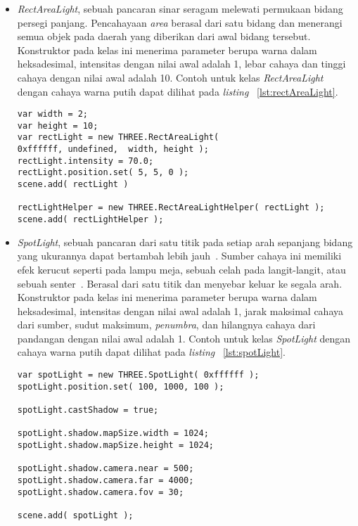 \begin{itemize}
\begin{itemize}
		\item {\it RectAreaLight}, sebuah pancaran sinar seragam melewati permukaan bidang persegi panjang. Pencahayaan {\it area} berasal dari satu bidang dan menerangi semua objek pada daerah yang diberikan dari awal bidang tersebut\cite{shadingConcept}. Konstruktor pada kelas ini menerima parameter berupa warna dalam heksadesimal, intensitas dengan nilai awal adalah 1, lebar cahaya dan tinggi cahaya dengan nilai awal adalah 10. Contoh untuk kelas {\it RectAreaLight} dengan cahaya warna putih dapat dilihat pada {\it listing} ~\ref{lst:rectAreaLight}.
\begin{lstlisting}[caption={Contoh penggunaan kelas {\it RectAreaLight}.}, label={lst:rectAreaLight},captionpos=b]
var width = 2;
var height = 10;
var rectLight = new THREE.RectAreaLight(
0xffffff, undefined,  width, height );
rectLight.intensity = 70.0;
rectLight.position.set( 5, 5, 0 );
scene.add( rectLight )

rectLightHelper = new THREE.RectAreaLightHelper( rectLight );
scene.add( rectLightHelper );
\end{lstlisting}
		\item {\it SpotLight}, sebuah pancaran dari satu titik pada setiap arah sepanjang bidang yang ukurannya dapat bertambah lebih jauh~\cite{threejs}. Sumber cahaya ini memiliki efek kerucut seperti pada lampu meja, sebuah celah pada langit-langit, atau sebuah senter~\cite{learningThreejs}. Berasal dari satu titik dan menyebar keluar ke segala arah\cite{shadingConcept}. Konstruktor pada kelas ini menerima parameter berupa warna dalam heksadesimal, intensitas dengan nilai awal adalah 1, jarak maksimal cahaya dari sumber, sudut maksimum, {\it penumbra}, dan hilangnya cahaya dari pandangan dengan nilai awal adalah 1. Contoh untuk kelas {\it SpotLight} dengan cahaya warna putih dapat dilihat pada {\it listing} ~\ref{lst:spotLight}.
\begin{lstlisting}[caption={Contoh penggunaan kelas {\it SpotLight}.}, label={lst:spotLight},captionpos=b]
var spotLight = new THREE.SpotLight( 0xffffff );
spotLight.position.set( 100, 1000, 100 );

spotLight.castShadow = true;

spotLight.shadow.mapSize.width = 1024;
spotLight.shadow.mapSize.height = 1024;

spotLight.shadow.camera.near = 500;
spotLight.shadow.camera.far = 4000;
spotLight.shadow.camera.fov = 30;

scene.add( spotLight );
\end{lstlisting}
	\end{itemize}
	

\end{itemize}
